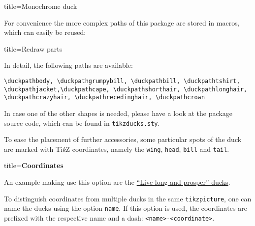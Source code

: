 \documentclass[parskip=half]{scrartcl}
\newcommand{\TikZ}{Ti\emph{k}Z\xspace}
\begin{document}
\begin{tcblisting}{title={Monochrome duck}}
\end{tcblisting}

For convenience the more complex paths of this package are stored in macros, which can easily be reused:

\begin{tcblisting}{title={Redraw parts}}
\begin{tikzpicture}
	\duck
	\path[preaction={fill, red!50!black},pattern=fivepointed stars, pattern color=yellow]  
			\duckpathlonghair;
\end{tikzpicture}
\end{tcblisting}

In detail, the following paths are available:

\begin{lstlisting}[aboveskip=1.2em,breakindent=0pt]
\duckpathbody, \duckpathgrumpybill, \duckpathbill, \duckpathtshirt, \duckpathjacket,\duckpathcape, \duckpathshorthair, \duckpathlonghair, \duckpathcrazyhair, \duckpathrecedinghair, \duckpathcrown
\end{lstlisting}

In case one of the other shapes is needed, please have a look at the package source code, which can be found in \lstinline|tikzducks.sty|.

To ease the placement of further accessories, some particular spots of the duck are marked with \TikZ coordinates, namely the \lstinline|wing|, \lstinline|head|, \lstinline|bill| and \lstinline|tail|. 

{
\footnotesize\ttfamily
\begin{tcblisting}{title={\normalfont\normalsize\bfseries Coordinates}}
\end{tcblisting}
}
An example making use this option are the \hyperref[starducks]{``Live long and prosper'' ducks}. 

To distinguish coordinates from multiple ducks in the same \lstinline|tikzpicture|, one can name the ducks using the option \lstinline[emph={name}]|name|. If this option is used, the coordinates are prefixed with the respective name and a dash: \lstinline|<name>-<coordinate>|.
\end{document}
